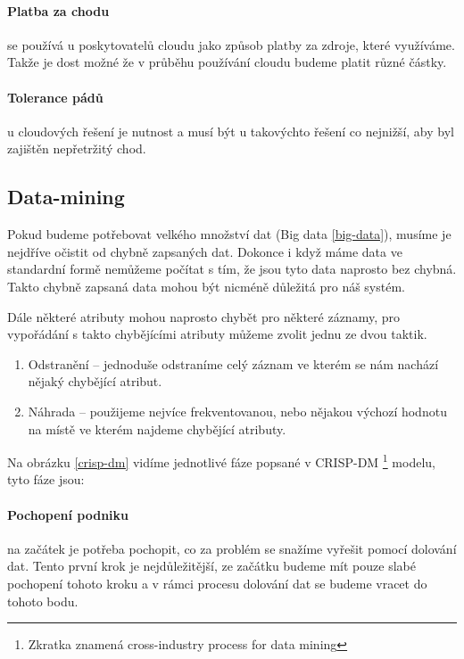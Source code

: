 \paragraph{Platba za chodu} se používá u poskytovatelů cloudu jako způsob platby za zdroje, které využíváme. Takže je dost možné že v průběhu používání cloudu budeme platit různé částky. \cite{big-data-dummies}

\paragraph{Tolerance pádů} u cloudových řešení je nutnost a musí být u takovýchto řešení co nejnižší, aby byl zajištěn nepřetržitý chod. \cite{big-data-dummies}

\subsection{Data-mining} \label{data-mining}
\par Pokud budeme potřebovat velkého množství dat (Big data \ref{big-data}), musíme je nejdříve očistit od chybně zapsaných dat. Dokonce i když máme data ve standardní formě nemůžeme počítat s tím, že jsou tyto data naprosto bez chybná. Takto chybně zapsaná data mohou být nicméně důležitá pro náš systém.\cite{data-mining-principles}

\par Dále některé atributy mohou naprosto chybět pro některé záznamy, pro vypořádání s takto chybějícími atributy můžeme zvolit jednu ze dvou taktik. \cite{data-mining-principles}
\begin{enumerate}
\item Odstranění -- jednoduše odstraníme celý záznam ve kterém se nám nachází nějaký chybějící atribut.
\item Náhrada -- použijeme nejvíce frekventovanou, nebo nějakou výchozí hodnotu na místě ve kterém najdeme chybějící atributy. \cite{data-mining-principles}
\end{enumerate}

\par Na obrázku \ref{crisp-dm} vidíme jednotlivé fáze popsané v CRISP-DM \footnote{Zkratka znamená cross-industry process for data mining} modelu, tyto fáze jsou:
\paragraph{Pochopení podniku} na začátek je potřeba pochopit, co za problém se snažíme vyřešit pomocí dolování dat. Tento první krok je nejdůležitější, ze začátku budeme mít pouze slabé pochopení tohoto kroku a v rámci procesu dolování dat se budeme vracet do tohoto bodu. \cite{data-mining-practical}

